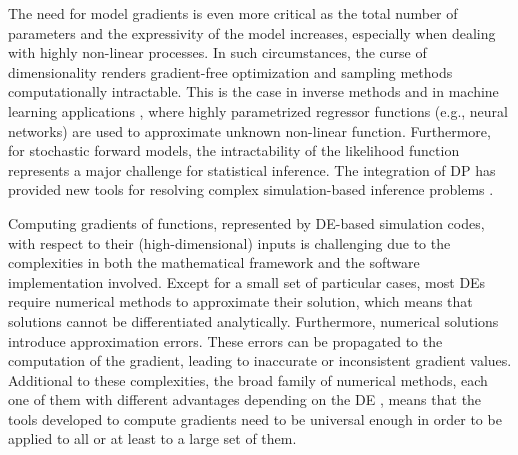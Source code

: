 The need for model gradients is even more critical as the total number of parameters and the expressivity of the model increases, especially when dealing with highly non-linear processes.
In such circumstances, the curse of dimensionality renders gradient-free optimization and sampling methods computationally intractable. 
This is the case in inverse methods \cite{Tarantola:2007wu, Ghattas.2021} and in machine learning applications \cite{LeCun2015}, where highly parametrized regressor functions (e.g., neural networks) are used to approximate unknown non-linear function.
Furthermore, for stochastic forward models, the intractability of the likelihood function represents a major challenge for statistical inference.
The integration of DP has provided new tools for resolving complex simulation-based inference problems \cite{Cranmer_Brehmer_Louppe_2020}.

Computing gradients of functions, represented by DE-based simulation codes, with respect to their (high-dimensional) inputs is challenging due to the complexities in both the mathematical framework and the software implementation involved.
Except for a small set of particular cases, most DEs require numerical methods to approximate their solution, which means that solutions cannot be differentiated analytically. 
Furthermore, numerical solutions introduce approximation errors. 
These errors can be propagated to the computation of the gradient, leading to inaccurate or inconsistent gradient values.  
Additional to these complexities, the broad family of numerical methods, each one of them with different advantages depending on the DE \cite{hairer-solving-1, hairer-solving-2}, means that the tools developed to compute gradients need to be universal enough in order to be applied to all or at least to a large set of them.


